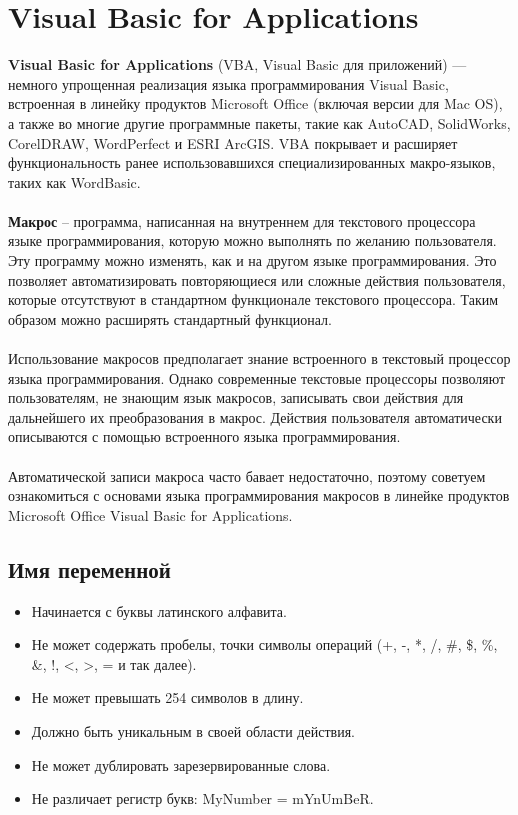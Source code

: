 \section{Visual Basic for Applications}
\textbf{Visual Basic for Applications} (VBA, Visual Basic для приложений) — немного упрощенная реализация языка программирования Visual Basic, встроенная в линейку продуктов Microsoft Office (включая версии для Mac OS), а также во многие другие программные пакеты, такие как AutoCAD, SolidWorks, CorelDRAW, WordPerfect и ESRI ArcGIS. VBA покрывает и расширяет функциональность ранее использовавшихся специализированных макро-языков, таких как WordBasic.
\\
\\\textbf{Макрос} – программа, написанная на внутреннем для текстового процессора языке программирования, которую можно выполнять по желанию пользователя. Эту программу можно изменять, как и на другом языке программирования. Это позволяет автоматизировать повторяющиеся или сложные действия пользователя, которые отсутствуют в стандартном функционале текстового процессора. Таким образом можно расширять стандартный функционал.
\\
\\Использование макросов предполагает знание встроенного в текстовый процессор языка программирования. Однако современные текстовые процессоры позволяют пользователям, не знающим язык макросов, записывать свои действия для дальнейшего их преобразования в макрос. Действия пользователя автоматически описываются с помощью встроенного языка программирования. 
\\
\\Автоматической записи макроса часто бавает недостаточно, поэтому советуем ознакомиться с основами языка программирования макросов в линейке продуктов Microsoft Office Visual Basic for Applications.
\subsection{Имя переменной}
\begin{itemize}
  \item Начинается с буквы латинского алфавита.
  \item Не может содержать пробелы, точки символы операций (+, -, *, /, \#, \$, \%, \&, !, <, >, = и так далее).
  \item Не может превышать 254 символов в длину.
  \item Должно быть уникальным в своей области действия.
  \item Не может дублировать зарезервированные слова.
  \item Не различает регистр букв: MyNumber = mYnUmBeR.
\end{itemize}
